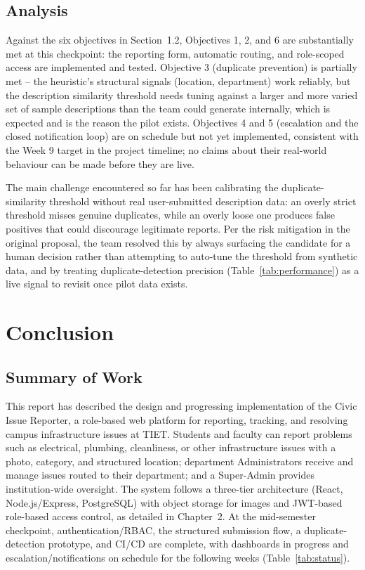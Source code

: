 \documentclass[11pt]{report}
\newcommand{\sysname}{Civic Issue Reporter\xspace}
\begin{document}
\section{Analysis}

Against the six objectives in Section~1.2, Objectives 1, 2, and 6 are
substantially met at this checkpoint: the reporting form, automatic
routing, and role-scoped access are implemented and tested. Objective 3
(duplicate prevention) is partially met -- the heuristic's structural
signals (location, department) work reliably, but the description
similarity threshold needs tuning against a larger and more varied set
of sample descriptions than the team could generate internally, which
is expected and is the reason the pilot exists. Objectives 4 and 5
(escalation and the closed notification loop) are on schedule but not
yet implemented, consistent with the Week 9 target in the project
timeline; no claims about their real-world behaviour can be made before
they are live.

The main challenge encountered so far has been calibrating the
duplicate-similarity threshold without real user-submitted description
data: an overly strict threshold misses genuine duplicates, while an
overly loose one produces false positives that could discourage
legitimate reports. Per the risk mitigation in the original proposal,
the team resolved this by always surfacing the candidate for a human
decision rather than attempting to auto-tune the threshold from
synthetic data, and by treating duplicate-detection precision
(Table~\ref{tab:performance}) as a live signal to revisit once pilot
data exists.

\chapter{Conclusion}

\section{Summary of Work}

This report has described the design and progressing implementation of
the \sysname, a role-based web platform for reporting, tracking, and
resolving campus infrastructure issues at TIET. Students and faculty can
report problems such as electrical, plumbing, cleanliness, or other
infrastructure issues with a photo, category, and structured location;
department Administrators receive and manage issues routed to their
department; and a Super-Admin provides institution-wide oversight. The
system follows a three-tier architecture (React, Node.js/Express,
PostgreSQL) with object storage for images and JWT-based role-based
access control, as detailed in Chapter~2. At the mid-semester
checkpoint, authentication/RBAC, the structured submission flow, a
duplicate-detection prototype, and CI/CD are complete, with dashboards
in progress and escalation/notifications on schedule for the following
weeks (Table~\ref{tab:status}).
\end{document}

